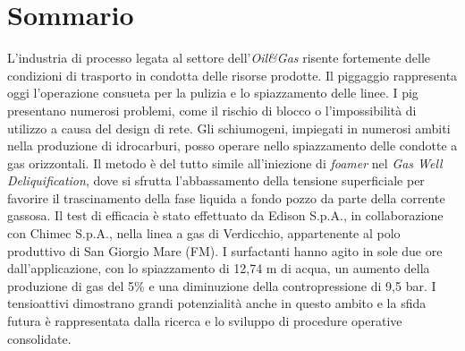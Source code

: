 \chapter*{Sommario}\thispagestyle{empty}    %
L'industria di processo legata al settore dell'\textit{Oil\&Gas} risente fortemente delle condizioni di trasporto in condotta delle risorse prodotte. Il piggaggio rappresenta oggi l'operazione consueta per la pulizia e lo spiazzamento delle linee. I pig presentano numerosi problemi, come il rischio di blocco  o l'impossibilità di utilizzo a causa del design di rete. Gli schiumogeni, impiegati in numerosi ambiti nella produzione di idrocarburi, posso operare nello spiazzamento delle condotte a gas orizzontali. Il metodo è del tutto simile all'iniezione di \textit{foamer} nel \textit{Gas Well Deliquification}, dove si sfrutta l'abbassamento della tensione superficiale per favorire il trascinamento della fase liquida a fondo pozzo da parte della corrente gassosa. Il test di efficacia è stato effettuato da Edison S.p.A., in collaborazione con Chimec S.p.A., nella linea a gas di Verdicchio, appartenente al polo produttivo di San Giorgio Mare (FM). I surfactanti hanno agito in sole due ore dall'applicazione, con lo spiazzamento di 12,74 m di acqua, un aumento della produzione di gas del 5\% e una diminuzione della contropressione di 9,5 bar. I tensioattivi dimostrano grandi potenzialità anche in questo ambito e la sfida futura è rappresentata dalla ricerca e lo sviluppo di procedure operative consolidate.
\clearpage{\pagestyle{empty}\cleardoublepage}